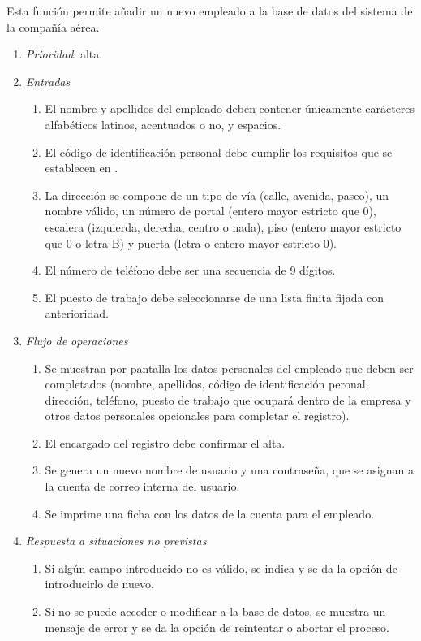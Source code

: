 

 \label{fun:registrarempleado}
	Esta función permite añadir un nuevo empleado a la base de datos del sistema de la compañía aérea.

	\begin{enumerate}
		\item \textit{Prioridad}: alta.
		\item \textit{Entradas}
		\begin{enumerate}
			\item El nombre y apellidos del empleado deben contener únicamente carácteres alfabéticos latinos, acentuados o no, y espacios.
			\item El código de identificación personal debe cumplir los requisitos que se establecen en .
			\item La dirección se compone de un tipo de vía (calle, avenida, paseo), un nombre válido, un número de portal (entero mayor estricto que 0), escalera (izquierda, derecha, centro o nada), piso (entero mayor estricto que 0 o letra B) y puerta (letra o entero mayor estricto 0).
			\item El número de teléfono debe ser una secuencia de 9 dígitos.
			\item El puesto de trabajo debe seleccionarse de una lista finita fijada con anterioridad.
		\end{enumerate}
		\item \textit{Flujo de operaciones}
		\begin{enumerate}
			\item Se muestran por pantalla los datos personales del empleado que deben ser completados (nombre, apellidos, código de identificación peronal, dirección, teléfono, puesto de trabajo que ocupará dentro de la empresa y otros datos personales opcionales para completar el registro).
			\item El encargado del registro debe confirmar el alta.
			\item Se genera un nuevo nombre de usuario y una contraseña, que se asignan a la cuenta de correo interna del usuario.
			\item Se imprime una ficha con los datos de la cuenta para el empleado.
		\end{enumerate}
		\item \textit{Respuesta a situaciones no previstas}
		\begin{enumerate}
			\item Si algún campo introducido no es válido, se indica y se da la opción de introducirlo de nuevo.
			\item Si no se puede acceder o modificar a la base de datos, se muestra un mensaje de error y se da la opción de reintentar o abortar el proceso.
		\end{enumerate}

	\end{enumerate}
